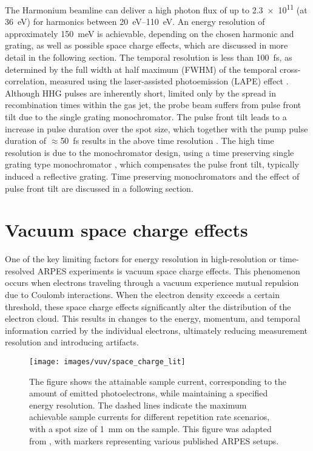 The Harmonium beamline can deliver a high photon flux of up to \qty{2.3e11}{\pps} (at \qty{36}{\electronvolt}) for harmonics between \qtyrange{20}{110}{\electronvolt}.
An energy resolution of approximately \qty{150}{\milli\electronvolt} is achievable, depending on the chosen harmonic and grating, as well as possible space charge effects, which are discussed in more detail in the following section.
The temporal resolution is less than \qty{100}{\femto\second}, as determined by the full width at half maximum (FWHM) of the temporal cross-correlation, measured using the laser-assisted photoemission (LAPE) effect \cite{ojeda_harmonium_2015}.
Although HHG pulses are inherently short, limited only by the spread in recombination times within the gas jet, the probe beam suffers from pulse front tilt due to the single grating monochromator.
The pulse front tilt leads to a increase in pulse duration over the spot size, which together with the pump pulse duration of $\approx$\qty{50}{\femto\second} results in the above time resolution \cite{arrell_harmonium_2017}.
The high time resolution is due to the monochromator design, using a time preserving single grating type monochromator \cite{poletto_time-preserving_2010}, which compensates the pulse front tilt, typically induced a reflective grating.
Time preserving monochromators and the effect of pulse front tilt are discussed in a following section.

\section{Vacuum space charge effects}
\label{sec:space_charge}

One of the key limiting factors for energy resolution in high-resolution or time-resolved ARPES experiments is vacuum space charge effects.
This phenomenon occurs when electrons traveling through a vacuum experience mutual repulsion due to Coulomb interactions.
When the electron density exceeds a certain threshold, these space charge effects significantly alter the distribution of the electron cloud.
This results in changes to the energy, momentum, and temporal information carried by the individual electrons, ultimately reducing measurement resolution and introducing artifacts.

\begin{figure}[b!]
	\centering
	\texttt{[image: images/vuv/space\_charge\_lit]}
	\caption{The figure shows the attainable sample current, corresponding to the amount of emitted photoelectrons, while maintaining a specified energy resolution. The dashed lines indicate the maximum achievable sample currents for different repetition rate scenarios, with a spot size of \qty{1}{\milli\meter} on the sample. This figure was adapted from \cite{corder_ultrafast_2018}, with markers representing various published ARPES setups.}
	\label{fig:spacechargelit}
\end{figure}

